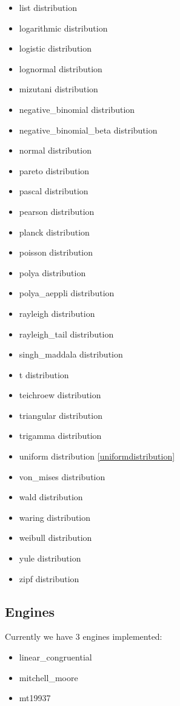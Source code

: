 \begin{itemize}
    \item list distribution
    \item logarithmic distribution
    \item logistic distribution
    \item lognormal distribution
    \item mizutani distribution
    \item negative\_binomial distribution
    \item negative\_binomial\_beta distribution
    \item normal distribution
    \item pareto distribution
    \item pascal distribution
    \item pearson distribution
    \item planck distribution
    \item poisson distribution
    \item polya distribution
    \item polya\_aeppli distribution
    \item rayleigh distribution
    \item rayleigh\_tail distribution
    \item singh\_maddala distribution
    \item t distribution
    \item teichroew distribution
    \item triangular distribution
    \item trigamma distribution
    \item uniform distribution \ref{uniformdistribution}
    \item von\_mises distribution
    \item wald distribution
    \item waring distribution
    \item weibull distribution
    \item yule distribution
    \item zipf distribution
\end{itemize}

\subsection{Engines}
Currently we have 3 engines implemented:
\begin{itemize}
    \item linear\_congruential
    \item mitchell\_moore
    \item mt19937
\end{itemize}



